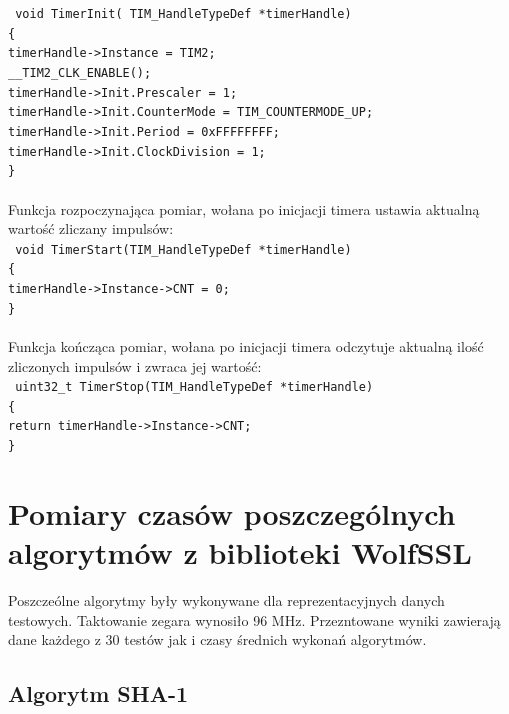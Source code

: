 \documentclass[oneside]{mgr}
\begin{document}
\texttt{
void TimerInit( TIM\_HandleTypeDef *timerHandle)\\
\{\\
\hspace*{10mm}timerHandle->Instance = TIM2;\\
\hspace*{10mm}\_\_TIM2\_CLK\_ENABLE();\\
\hspace*{10mm}timerHandle->Init.Prescaler = 1;\\
\hspace*{10mm}timerHandle->Init.CounterMode = TIM\_COUNTERMODE\_UP;\\
\hspace*{10mm}timerHandle->Init.Period = 0xFFFFFFFF;\\
\hspace*{10mm}timerHandle->Init.ClockDivision = 1;\\\}\\
}
\\Funkcja rozpoczynająca pomiar, wołana po inicjacji timera ustawia aktualną wartość zliczany impulsów:\\
\texttt{
void TimerStart(TIM\_HandleTypeDef *timerHandle)\\
\{\\
\hspace*{10mm}timerHandle->Instance->CNT = 0;\\
\}\\
}
\\Funkcja kończąca pomiar, wołana po inicjacji timera odczytuje aktualną ilość zliczonych impulsów i zwraca jej wartość:\\
\texttt{
uint32\_t TimerStop(TIM\_HandleTypeDef *timerHandle)\\
\{\\
\hspace*{10mm}return timerHandle->Instance->CNT;\\
\}
}
\chapter{Pomiary czasów poszczególnych algorytmów z biblioteki WolfSSL}

Poszczeólne algorytmy były wykonywane dla reprezentacyjnych danych testowych. Taktowanie zegara wynosiło 96 MHz. Przezntowane wyniki zawierają dane każdego z 30 testów jak i czasy średnich wykonań algorytmów.
\section{Algorytm SHA-1}
\end{document}
